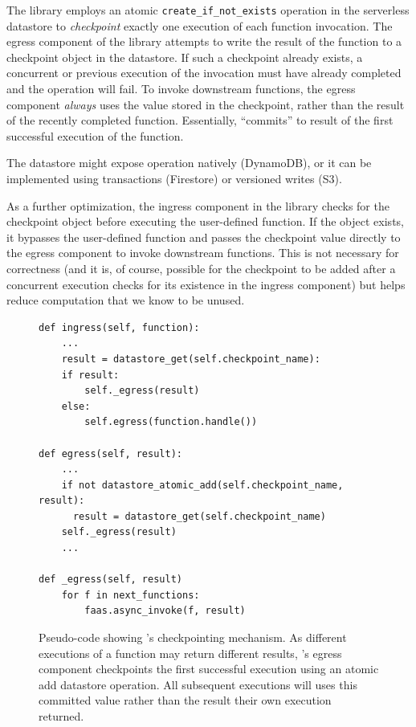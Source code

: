The \name{} library employs an atomic \texttt{create\_if\_not\_exists} operation
in the serverless datastore to \emph{checkpoint} exactly one execution of each
function invocation. The egress component of the \name{} library attempts to
write the result of the function to a checkpoint object in the datastore. If
such a checkpoint already exists, a concurrent or previous execution of the
invocation must have already completed and the operation will fail. To invoke
downstream functions, the egress component \emph{always} uses the value stored
in the checkpoint, rather than the result of the recently completed function.
Essentially, \name{} ``commits'' to result of the first successful execution of
the function.

The datastore might expose operation natively (DynamoDB), or it can be
implemented using transactions (Firestore) or versioned writes (S3).

As a further optimization, the ingress component in the \name{} library checks
for the checkpoint object before executing the user-defined function. If the
object exists, it bypasses the user-defined function and passes the checkpoint
value directly to the egress component to invoke downstream functions. This is
not necessary for correctness (and it is, of course, possible for the checkpoint
to be added after a concurrent execution checks for its existence in the ingress
component) but helps reduce computation that we know to be unused.

\begin{figure}
\begin{verbatim}
def ingress(self, function):
    ...
    result = datastore_get(self.checkpoint_name):
    if result:
        self._egress(result)
    else:
        self.egress(function.handle())

def egress(self, result):
    ...
    if not datastore_atomic_add(self.checkpoint_name, result):
      result = datastore_get(self.checkpoint_name)
    self._egress(result)
    ...

def _egress(self, result)
    for f in next_functions:
        faas.async_invoke(f, result)
\end{verbatim}
\caption{Pseudo-code showing \name{}'s checkpointing mechanism. As different
executions of a function may return different results, \name{}'s egress
component checkpoints the first successful execution using an atomic add
datastore operation. All subsequent executions will uses this committed value
rather than the result their own execution returned.}
\label{fig:design:checkpoint}
\end{figure}

